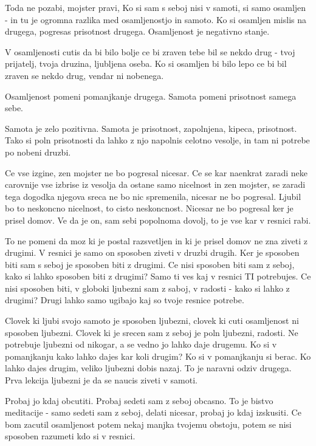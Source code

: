 Toda ne pozabi, mojster pravi,  Ko si sam s seboj nisi v samoti, si samo osamljen - in tu je ogromna razlika med osamljenostjo in samoto. Ko si osamljen mislis na drugega, pogresas prisotnost drugega. Osamljenost je negativno stanje. 

V osamljenosti cutis da bi bilo bolje ce bi zraven tebe bil se nekdo drug - tvoj prijatelj, tvoja druzina, ljubljena oseba. Ko si osamljen bi bilo lepo ce bi bil zraven se nekdo drug, vendar ni nobenega. 

Osamljenost pomeni pomanjkanje drugega. Samota pomeni prisotnost samega sebe. 

Samota je zelo pozitivna. Samota je prisotnost, zapolnjena, kipeca, prisotnost. Tako si poln prisotnosti da lahko z njo napolnis celotno vesolje, in tam ni potrebe po nobeni druzbi. 

Ce vse izgine, zen mojster ne bo pogresal nicesar. Ce se kar naenkrat zaradi neke carovnije vse izbrise iz vesolja da ostane samo nicelnost in zen mojster, se zaradi tega dogodka njegova sreca ne bo nic spremenila, nicesar ne bo pogresal. Ljubil bo to neskoncno nicelnost, to cisto neskoncnost. Nicesar ne bo pogresal ker je prisel domov. Ve da je on, sam sebi popolnoma dovolj, to je vse kar v resnici rabi. 

To ne pomeni da moz ki je postal razsvetljen in ki je prisel domov ne zna ziveti z drugimi. V resnici je samo on sposoben ziveti v druzbi drugih. Ker je sposoben biti sam s seboj je sposoben biti z drugimi. Ce nisi sposoben biti sam z seboj, kako si lahko sposoben biti z drugimi? Samo ti ves kaj v resnici TI potrebujes. Ce nisi sposoben biti, v globoki ljubezni sam z saboj, v radosti - kako si lahko z drugimi? Drugi lahko samo ugibajo kaj so tvoje resnice potrebe. 

Clovek ki ljubi svojo samoto je sposoben ljubezni, clovek ki cuti osamljenost ni sposoben ljubezni. Clovek ki je srecen sam z seboj je poln ljubezni, radosti. Ne potrebuje ljubezni od nikogar, a se vedno jo lahko daje drugemu. Ko si v pomanjkanju kako lahko dajes kar koli drugim? Ko si v pomanjkanju si berac. Ko lahko dajes drugim, veliko ljubezni dobis nazaj. To je naravni odziv drugega. Prva lekcija ljubezni je da se naucis ziveti v samoti. 

Probaj jo kdaj obcutiti. Probaj sedeti sam z seboj obcasno. To je bistvo meditacije - samo sedeti sam z seboj, delati nicesar, probaj jo kdaj izskusiti. Ce bom zacutil osamljenost potem nekaj manjka tvojemu obstoju, potem se nisi sposoben razumeti kdo si v resnici. 

